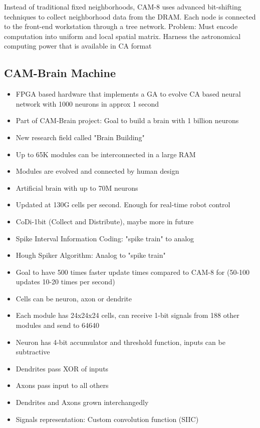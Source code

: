 Instead of traditional fixed neighborhoods, CAM-8 uses advanced bit-shifting techniques to collect neighborhood data from the DRAM.
Each node is connected to the front-end workstation through a tree network.
Problem: Must encode computation into uniform and local spatial matrix.
Harness the astronomical computing power that is available in CA format

\subsection{CAM-Brain Machine}

\begin{itemize}
    \item FPGA based hardware that implements a GA to evolve CA based neural network with 1000 neurons in approx 1 second
    \item Part of CAM-Brain project: Goal to build a brain with 1 billion neurons
    \item New research field called "Brain Building"
    \item Up to 65K modules can be interconnected in a large RAM
    \item Modules are evolved and connected by human design
    \item Artificial brain with up to 70M neurons
    \item Updated at 130G cells per second. Enough for real-time robot control
    \item CoDi-1bit (Collect and Distribute), maybe more in future
    \item Spike Interval Information Coding: "spike train" to analog
    \item Hough Spiker Algorithm: Analog to "spike train"
    \item Goal to have 500 times faster update times compared to CAM-8 for (50-100 updates 10-20 times per second)
    \item Cells can be neuron, axon or dendrite
    \item Each module has 24x24x24 cells, can receive 1-bit signals from 188 other modules and send to 64640
    \item Neuron has 4-bit accumulator and threshold function, inputs can be subtractive
    \item Dendrites pass XOR of inputs
    \item Axons pass input to all others
    \item Dendrites and Axons grown interchangedly
    \item Signals representation: Custom convolution function (SIIC)

\end{itemize}
